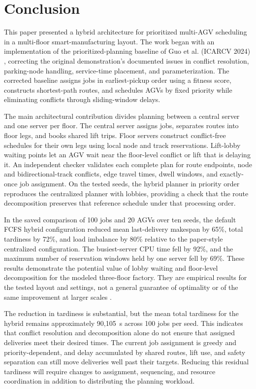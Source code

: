 \section{Conclusion}
\label{sec:conclusion}

This paper presented a hybrid architecture for prioritized multi-AGV
scheduling in a multi-floor smart-manufacturing layout. The work began with
an implementation of the prioritized-planning baseline of Guo et al.
(ICARCV 2024) \cite{guo2024}, correcting the original demonstration's documented issues in
conflict resolution, parking-node handling, service-time placement, and
parameterization. The corrected baseline assigns jobs in earliest-pickup
order using a fitness score, constructs shortest-path routes, and schedules
AGVs by fixed priority while eliminating conflicts through sliding-window
delays.

The main architectural contribution divides planning between a central
server and one server per floor. The central server assigns jobs, separates
routes into floor legs, and books shared lift trips. Floor servers construct
conflict-free schedules for their own legs using local node and track
reservations. Lift-lobby waiting points let an AGV wait near the floor-level
conflict or lift that is delaying it. An independent checker validates each
complete plan for route endpoints, node and bidirectional-track conflicts,
edge travel times, dwell windows, and exactly-once job assignment. On the
tested seeds, the hybrid planner in priority order reproduces the centralized
planner with lobbies, providing a check that the route decomposition
preserves that reference schedule under that processing order.

In the saved comparison of 100 jobs and 20 AGVs over ten seeds, the default
FCFS hybrid configuration reduced mean last-delivery makespan by 65\%, total
tardiness by 72\%, and load imbalance by 80\% relative to the paper-style
centralized configuration. The busiest-server CPU time fell by 92\%, and the
maximum number of reservation windows held by one server fell by 69\%. These
results demonstrate the potential value of lobby waiting and floor-level
decomposition for the modeled three-floor factory. They are empirical
results for the tested layout and settings, not a general guarantee of
optimality or of the same improvement at larger scales \cite{projectRepo}.

The reduction in tardiness is substantial, but the mean total tardiness for
the hybrid remains approximately 90,105~s across 100 jobs per seed. This
indicates that conflict resolution and decomposition alone do not ensure
that assigned deliveries meet their desired times. The current job assignment
is greedy and priority-dependent, and delay accumulated by shared routes,
lift use, and safety separation can still move deliveries well past their
targets. Reducing this residual tardiness will require changes to assignment,
sequencing, and resource coordination in addition to distributing the
planning workload.

